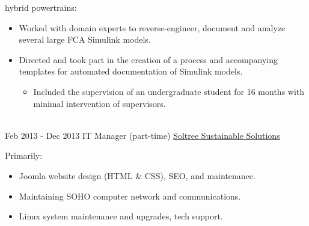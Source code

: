 \documentclass[letterpaper]{twentysecondcv} %
\begin{document}
\begin{twenty}
{%
    hybrid powertrains:
    \begin{itemize}
			\item Worked with domain experts to reverse-engineer, document and analyze several large FCA Simulink models.
			\item Directed and took part in the creation of a process and accompanying templates for automated documentation of Simulink models.
      \begin{itemize}
        \item Included the supervision of an undergraduate student for 16 months with minimal intervention of supervisors.
      \end{itemize}
	\end{itemize}}
	\\
	\twentyitem
	{Feb 2013 -}
	{Dec 2013}
	{IT Manager (part-time)}
	{\href{http://www.soltree.net/}{Soltree Sustainable Solutions}}
	{}
	{Primarily:\begin{itemize}
			\item Joomla website design (HTML \& CSS), SEO,
      and
      maintenance.
			\item Maintaining SOHO computer network and communications.
			\item Linux system maintenance and upgrades, tech support.%
	\end{itemize}}
\end{twenty} 
\vspace{-.5em}
\end{document}
